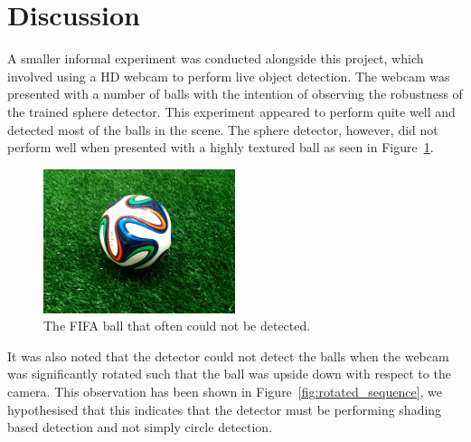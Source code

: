 \documentclass{llncs}
\begin{document}
	\section{Discussion} {



		A smaller informal experiment was conducted alongside this project, which involved using a HD webcam to perform live object detection. The webcam was presented with a number of balls with the intention of observing the robustness of the trained sphere detector. This experiment appeared to perform quite well and detected most of the balls in the scene. The sphere detector, however, did not perform well when presented with a highly textured ball as seen in Figure~\ref{fig:fifa_ball}.

		\begin{figure}
			\centering
			\includegraphics[width=0.5\textwidth]{images/fifa_ball}
			\caption{The FIFA ball that often could not be detected.}
			\label{fig:fifa_ball}
		\end{figure}

		It was also noted that the detector could not detect the balls when the webcam was significantly rotated such that the ball was upside down with respect to the camera. This observation has been shown in Figure~\ref{fig:rotated_sequence}, we hypothesised that this indicates that the detector must be performing shading based detection and not simply circle detection.

		\newcommand{\includesequence}[1]{\hspace{0.05cm}\texttt{[image: images/rotation/\#1]}}

}
\end{document}
